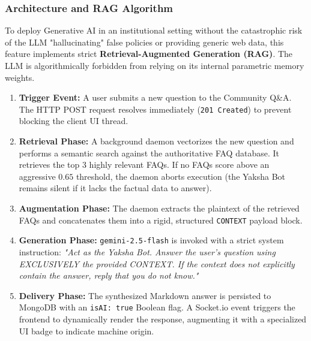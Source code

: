 \documentclass[12pt,a4paper]{article}
\begin{document}
\subsubsection{Architecture and RAG Algorithm}
To deploy Generative AI in an institutional setting without the catastrophic risk of the LLM "hallucinating" false policies or providing generic web data, this feature implements strict \textbf{Retrieval-Augmented Generation (RAG)}. The LLM is algorithmically forbidden from relying on its internal parametric memory weights.

\begin{enumerate}
    \item \textbf{Trigger Event:} A user submits a new question to the Community Q\&A. The HTTP POST request resolves immediately (\texttt{201 Created}) to prevent blocking the client UI thread.
    \item \textbf{Retrieval Phase:} A background daemon vectorizes the new question and performs a semantic search against the authoritative FAQ database. It retrieves the top 3 highly relevant FAQs. If no FAQs score above an aggressive $0.65$ threshold, the daemon aborts execution (the Yaksha Bot remains silent if it lacks the factual data to answer).
    \item \textbf{Augmentation Phase:} The daemon extracts the plaintext of the retrieved FAQs and concatenates them into a rigid, structured \texttt{CONTEXT} payload block.
    \item \textbf{Generation Phase:} \texttt{gemini-2.5-flash} is invoked with a strict system instruction: \textit{"Act as the Yaksha Bot. Answer the user's question using EXCLUSIVELY the provided CONTEXT. If the context does not explicitly contain the answer, reply that you do not know."}
    \item \textbf{Delivery Phase:} The synthesized Markdown answer is persisted to MongoDB with an \texttt{isAI: true} Boolean flag. A Socket.io event triggers the frontend to dynamically render the response, augmenting it with a specialized UI badge to indicate machine origin.
\end{enumerate}
\end{document}
